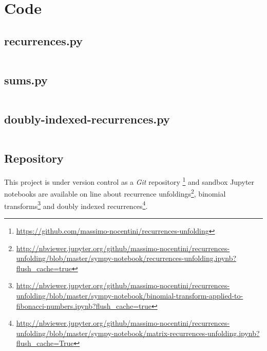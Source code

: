 
\chapter{Code}

\section{recurrences.py}
\begin{adjustwidth}{-4cm}{0cm}
    \inputminted{python}{../sympy-notebook/recurrences.py}
\end{adjustwidth}

\section{sums.py}

\begin{adjustwidth}{-4cm}{0cm}
    \inputminted{python}{../sympy-notebook/sums.py}
\end{adjustwidth}

\section{doubly-indexed-recurrences.py}

\begin{adjustwidth}{-4cm}{0cm}
    \inputminted{python}{../sympy-notebook/doubly-indexed-recurrences.py}
\end{adjustwidth}

\section{Repository}

This project is under version control as a \emph{Git} repository
\footnote{\url{https://github.com/massimo-nocentini/recurrences-unfolding}}
and sandbox Jupyter notebooks are available on line about recurrence
unfoldings\footnote{\url{http://nbviewer.jupyter.org/github/massimo-nocentini/recurrences-unfolding/blob/master/sympy-notebook/recurrences-unfolding.ipynb?flush_cache=true}},
binomial transforms\footnote{\url{http://nbviewer.jupyter.org/github/massimo-nocentini/recurrences-unfolding/blob/master/sympy-notebook/binomial-transform-applied-to-fibonacci-numbers.ipynb?flush_cache=true}}
and doubly indexed recurrences\footnote{\url{http://nbviewer.jupyter.org/github/massimo-nocentini/recurrences-unfolding/blob/master/sympy-notebook/matrix-recurrences-unfolding.ipynb?flush_cache=True}}.

